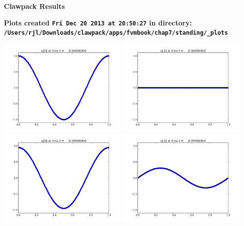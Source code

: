 \documentclass[11pt]{article}
\begin{document}
        \begin{center}{\Large\bf Clawpack Results}\vskip 5pt
        
        \bf Plots created {\tt Fri Dec 20 2013 at 20:50:27} in directory: \vskip 5pt
        \verb+/Users/rjl/Downloads/clawpack/apps/fvmbook/chap7/standing/_plots+
        \end{center}
        \vskip 5pt
        \includegraphics[width=0.475\textwidth]{frame0000fig0.png}
\includegraphics[width=0.475\textwidth]{frame0000fig1.png}
\vskip 10pt 
\includegraphics[width=0.475\textwidth]{frame0001fig0.png}
\includegraphics[width=0.475\textwidth]{frame0001fig1.png}
\vskip 10pt 
\end{document}
